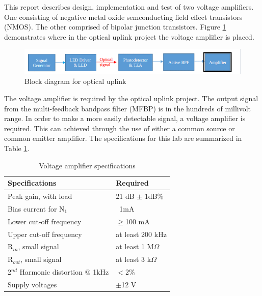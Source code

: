 




\noindent This report describes design, implementation and test of two voltage amplifiers. One consisting of negative metal oxide semconducting field effect transistors (NMOS). The other comprised of bipolar junction transistors. Figure \ref{fig:blockdiagram2} demonstrates where in the optical uplink project the voltage amplifier is placed. 


\begin{figure}[H]
    \centering
    \includegraphics[width=.9\textwidth ]{Introduction/Block_Diagram_MFBP.png}
    \caption{Block diagram for optical uplink \cite{b1}}
    \label{fig:blockdiagram2}
\end{figure}

The voltage amplifier is required by the optical uplink project. The output signal from the multi-feedback bandpass filter (MFBP) is in the hundreds of millivolt range. In order to make a more easily detectable signal, a voltage amplifier is required. This can achieved through the use of either a common source or common emitter amplifier. The specifications for this lab are summarized in Table \ref{tab:specifications}.

\begin{table}[H]
	\centering
	\caption{Voltage amplifier specifications}
	\label{tab:specifications}
	\begin{tabular}{|l|l|}
		\hline
		Specifications & Required       \\ \hline
		Peak gain, with load      & 21 dB $\pm$ 1dB\% \\ \hline
		Bias current for N$_1$     & ~1mA          \\ \hline
		Lower cut-off frequency      & $\geq$100 mA    \\ \hline
		Upper cut-off frequency    &  at least 200 kHz \\ \hline
		R$_{in}$, small signal       &  at least 1 M$\Omega$ \\ \hline
		R$_{out}$, small signal      &  at least 3 k$\Omega$ \\ \hline
		2$^{nd}$ Harmonic distortion $@$ 1kHz  & $<$2\% \\ \hline
		Supply voltages            &  $\pm$12 V     \\  \hline
	\end{tabular}
\end{table}



